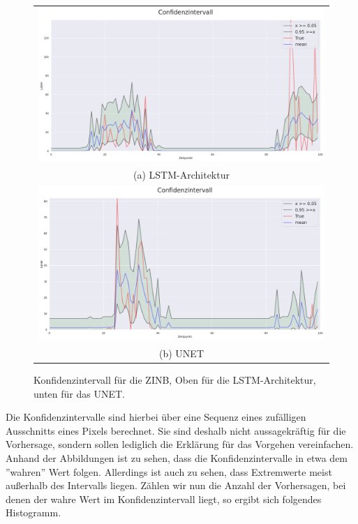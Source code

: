 \begin{figure}[h]
\centering
\begin{tabular}{c}
\includegraphics[width=120mm]{abb/quantile_LSTM.png}\\
(a) \small{LSTM-Architektur}\\
\includegraphics[width=120mm]{abb/quantile_UNET.png}\\
(b) \small{UNET}
\end{tabular}
\caption{Konfidenzintervall für die ZINB, Oben für die LSTM-Architektur, unten für das UNET. \label{fig:konfidenzintervall}}
\end{figure}

\noindent Die Konfidenzintervalle sind hierbei über eine Sequenz eines zufälligen Ausschnitts eines Pixels berechnet. Sie sind deshalb nicht aussagekräftig für die Vorhersage, sondern sollen lediglich die Erklärung für das Vorgehen vereinfachen. Anhand der Abbildungen ist zu sehen, dass die Konfidenzintervalle in etwa dem ''wahren'' Wert folgen. Allerdings ist auch zu sehen, dass Extremwerte meist außerhalb des Intervalls liegen. Zählen wir nun die Anzahl der Vorhersagen, bei denen der wahre Wert im Konfidenzintervall liegt, so ergibt sich folgendes Histogramm.\\



